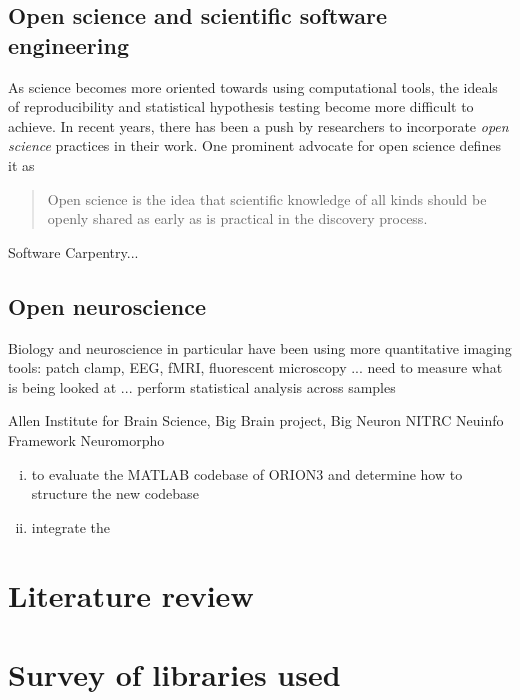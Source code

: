 \subsection{Open science and scientific software engineering}

As science becomes more oriented towards using computational
tools, the ideals of reproducibility and statistical hypothesis
testing become more difficult to achieve. In recent years, there
has been a push by researchers to incorporate \emph{open science}
practices in their work. One prominent advocate for open science
defines it as
\begin{quote}
	\begin{fancyquote}
	Open science is the idea that scientific knowledge of all kinds
	should be openly shared as early as is practical in the discovery
	process.
	\end{fancyquote}
\end{quote}

%



Software Carpentry...


\subsection{Open neuroscience}
Biology and neuroscience in particular have been using more
quantitative imaging tools: patch clamp, EEG, fMRI, fluorescent
microscopy ... need to measure what is being looked at ... perform
statistical analysis across samples

Allen Institute for Brain Science,
Big Brain project,
Big Neuron
NITRC
Neuinfo  Framework
Neuromorpho
\citep{FrontNeuroinform:NeuroDebian}

\begin{enumerate}[(i)]
\item to evaluate the MATLAB codebase of ORION3 and determine how to structure the new codebase
\item integrate the
\end{enumerate}

\section{Literature review}

%

\section{Survey of libraries used}


